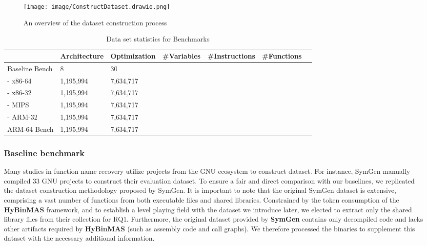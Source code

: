 \documentclass[acmsmall,screen,review,anonymous]{acmart} %
\begin{document}
\begin{figure}[t] %
    \centering
    \texttt{[image: image/ConstructDataset.drawio.png]} %
    \caption{An overview of the dataset construction process} %
    \label{fig:construct-dataset} %
\end{figure}


\renewcommand\arraystretch{1.31}
\begin{table}[tb]
  \centering
  \footnotesize
  \caption{Data set statistics for Benchmarks}\label{table:data}
    \begin{tabular}{p{2.5cm}p{1.6cm}p{1.6cm}p{1.6cm}p{1.6cm}p{1.6cm}p{1.6cm}}
   \toprule
     & Architecture & Optimization & \#Variables & \#Instructions &\#Functions\\
    \hline
    Baseline Bench  & 8 & 30\\
    - x86-64 &1,195,994 & 7,634,717\\
    - x86-32 &1,195,994 & 7,634,717\\
    - MIPS &1,195,994 & 7,634,717\\
    - ARM-32 &1,195,994 & 7,634,717\\
    ARM-64 Bench  &1,195,994 & 7,634,717\\
    \bottomrule
  \end{tabular}
  \vspace{-0.2in}
\end{table}
\renewcommand\arraystretch{1.0}


\subsubsection{Baseline benchmark}
Many studies in function name recovery utilize projects from the GNU ecosystem to construct dataset. For instance, SymGen\cite{SymGen} manually compiled 33 GNU\cite{GNU} projects to construct their evaluation dataset. To ensure a fair and direct comparison with our baselines, we replicated the dataset construction methodology proposed by SymGen. It is important to note that the original SymGen dataset is extensive, comprising a vast number of functions from both executable files and shared libraries. Constrained by the token consumption of the \textbf{HyBinMAS} framework, and to establish a level playing field with the dataset we introduce later, we elected to extract only the shared library files from their collection for RQ1. Furthermore, the original dataset provided by \textbf{SymGen} contains only decompiled code and lacks other artifacts required by \textbf{HyBinMAS} (such as assembly code and call graphs). We therefore processed the binaries to supplement this dataset with the necessary additional information. %
\end{document}
